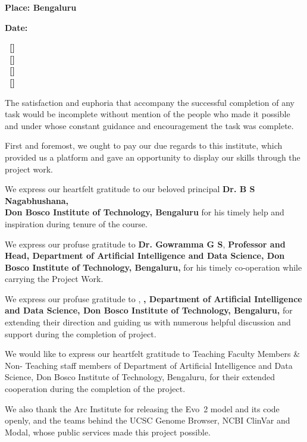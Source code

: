 \vspace{20pt}
\noindent\textbf{Place: Bengaluru}\par\vspace{-6pt}
\noindent\textbf{Date:}
\vfill
\begin{minipage}{462pt}\begin{flushright}
\renewcommand{\baselinestretch}{1.2}\selectfont
\textbf{\NameA\ [\UsnA]}\\[6pt]
\textbf{\NameB\ [\UsnB]}\\[6pt]
\textbf{\NameC\ [\UsnC]}\\[6pt]
\textbf{\NameD\ [\UsnD]}
\end{flushright}\end{minipage}
\vspace{40pt}
\newpage

{\renewcommand{\baselinestretch}{1}\selectfont\begin{center}\end{center}}
\vspace{8pt}
\begin{minipage}{462pt}
\setlength{\parskip}{6pt}\setlength{\parindent}{16pt}
The satisfaction and euphoria that accompany the successful completion of any task would be incomplete without mention of the people who made it possible and under whose constant guidance and encouragement the task was complete.

First and foremost, we ought to pay our due regards to this institute, which provided us a platform and gave an opportunity to display our skills through the project work.

We express our heartfelt gratitude to our beloved principal \textbf{Dr. B S Nagabhushana,}\\
\textbf{Don Bosco Institute of Technology, Bengaluru} for his timely help and inspiration during tenure of the course.

We express our profuse gratitude to \textbf{Dr. Gowramma G S}, \textbf{Professor and Head, Department of Artificial Intelligence and Data Science, Don Bosco Institute of Technology, Bengaluru,} for his timely co-operation while carrying the Project Work.

We express our profuse gratitude to \textbf{\GuideName}, \textbf{\GuideDesig, Department of Artificial Intelligence and Data Science, Don Bosco Institute of Technology, Bengaluru,} for extending their direction and guiding us with numerous helpful discussion and support during the completion of project.

We would like to express our heartfelt gratitude to Teaching Faculty Members \& Non- Teaching staff members of Department of Artificial Intelligence and Data Science, Don Bosco Institute of Technology, Bengaluru, for their extended cooperation during the completion of the project.

We also thank the Arc Institute for releasing the Evo~2 model and its code openly, and the teams behind the UCSC Genome Browser, NCBI ClinVar and Modal, whose public services made this project possible.
\end{minipage}
